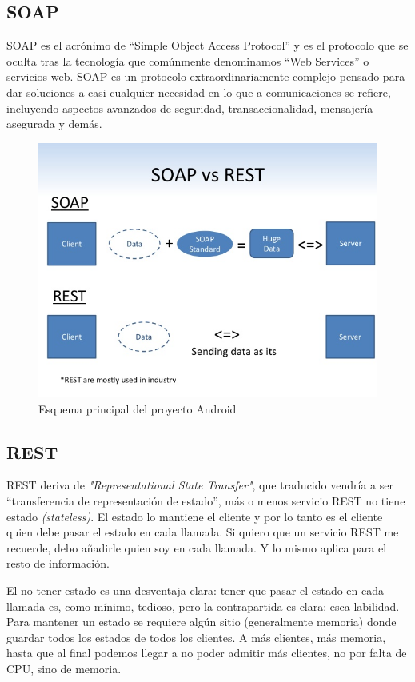 \subsection{SOAP}
SOAP es el acrónimo de “Simple Object Access Protocol” y es el protocolo que se oculta tras la tecnología que comúnmente denominamos “Web Services” o servicios web. SOAP es un protocolo extraordinariamente complejo pensado para dar soluciones a casi cualquier necesidad en lo que a comunicaciones se refiere, incluyendo aspectos avanzados de seguridad, transaccionalidad, mensajería asegurada y demás. 

\begin{figure}[H]
	\centering
	\includegraphics[width=0.7\linewidth]{figuras/soapVSrest}
	\caption{Esquema principal del proyecto Android} 
	\label{fig:soapVSrest}
\end{figure}

\subsection{REST}
REST deriva de \textit{"Representational State Transfer"}, que traducido vendría a ser “transferencia de representación de estado”, más o menos servicio REST no tiene estado \textit{(stateless)}. El estado lo mantiene el cliente y por lo tanto es el cliente quien debe pasar el estado en cada llamada. Si quiero que un servicio REST me recuerde, debo añadirle quien soy en cada llamada. Y lo mismo aplica para el resto de información. 

El no tener estado es una desventaja clara: tener que pasar el estado en cada llamada es, como mínimo, tedioso, pero la contrapartida es clara: esca labilidad. Para mantener un estado se requiere algún sitio (generalmente memoria) donde guardar todos los estados de todos los clientes. A más clientes, más memoria, hasta que al final podemos llegar a no poder admitir más clientes, no por falta de CPU, sino de memoria. 

